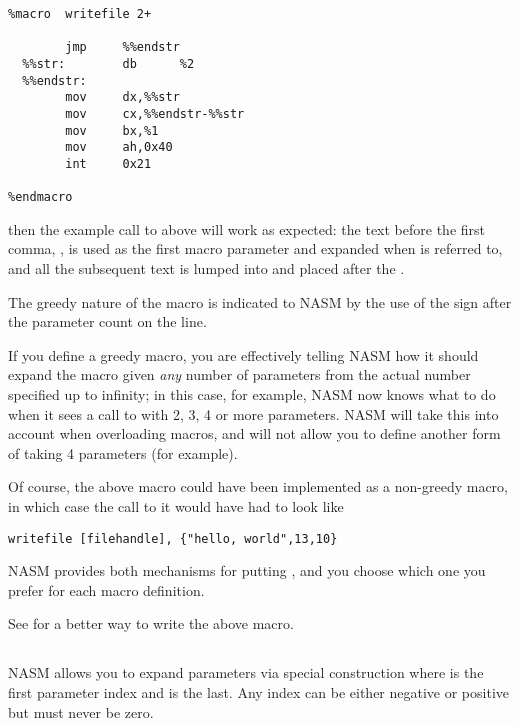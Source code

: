 \begin{lstlisting}
%macro  writefile 2+

        jmp     %%endstr
  %%str:        db      %2
  %%endstr:
        mov     dx,%%str
        mov     cx,%%endstr-%%str
        mov     bx,%1
        mov     ah,0x40
        int     0x21

%endmacro
\end{lstlisting}

then the example call to  above will work as expected:
the text before the first comma, \code{[filehandle]}, is used as the
first macro parameter and expanded when  is referred to, and
all the subsequent text is lumped into  and placed after the
.

The greedy nature of the macro is indicated to NASM by the use of
the \code{+} sign after the parameter count on the
 line.

If you define a greedy macro, you are effectively telling NASM how
it should expand the macro given \emph{any} number of parameters from
the actual number specified up to infinity; in this case, for
example, NASM now knows what to do when it sees a call to
 with 2, 3, 4 or more parameters. NASM will take this
into account when overloading macros, and will not allow you to
define another form of  taking 4 parameters (for
example).

Of course, the above macro could have been implemented as a
non-greedy macro, in which case the call to it would have had to
look like

\begin{lstlisting}
writefile [filehandle], {"hello, world",13,10}
\end{lstlisting}

NASM provides both mechanisms for putting , and you choose which one you prefer for each macro
definition.

See  for a better way to write the above macro.

\subsection{}
\label{subsec:mlmacrange}

NASM allows you to expand parameters via special construction 
where  is the first parameter index and  is the last.
Any index can be either negative or positive but must never be zero.

